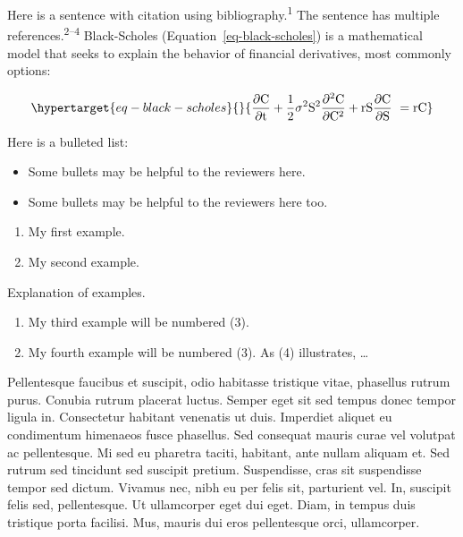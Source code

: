 \documentclass[
  11pt,
  letterpaper,
  DIV=11,
  numbers=noendperiod]{scrartcl}
\providecommand{\tightlist}{%
  \setlength{\itemsep}{0pt}\setlength{\parskip}{0pt}}\usepackage{longtable,booktabs,array}
\begin{document}
Here is a sentence with citation using bibliography.\textsuperscript{1}
The sentence has multiple references.\textsuperscript{2--4}
Black-Scholes (Equation~\ref{eq-black-scholes}) is a mathematical model
that seeks to explain the behavior of financial derivatives, most
commonly options:

\begin{equation}\protect\hypertarget{eq-black-scholes}{}{
\frac{\partial \mathrm C}{ \partial \mathrm t } + \frac{1}{2}\sigma^{2} \mathrm S^{2}
\frac{\partial^{2} \mathrm C}{\partial \mathrm C^2}
  + \mathrm r \mathrm S \frac{\partial \mathrm C}{\partial \mathrm S}\ =
  \mathrm r \mathrm C 
}\label{eq-black-scholes}\end{equation}

Here is a bulleted list:

\begin{itemize}
\tightlist
\item
  Some bullets may be helpful to the reviewers here.
\item
  Some bullets may be helpful to the reviewers here too.
\end{itemize}

\begin{enumerate}
\def\labelenumi{(\arabic{enumi})}
\tightlist
\item
  My first example.
\item
  My second example.
\end{enumerate}

Explanation of examples.

\begin{enumerate}
\def\labelenumi{(\arabic{enumi})}
\setcounter{enumi}{2}
\tightlist
\item
  My third example will be numbered (3).
\item
  My fourth example will be numbered (3). As (4) illustrates, \ldots{}
\end{enumerate}

Pellentesque faucibus et suscipit, odio habitasse tristique vitae,
phasellus rutrum purus. Conubia rutrum placerat luctus. Semper eget sit
sed tempus donec tempor ligula in. Consectetur habitant venenatis ut
duis. Imperdiet aliquet eu condimentum himenaeos fusce phasellus. Sed
consequat mauris curae vel volutpat ac pellentesque. Mi sed eu pharetra
taciti, habitant, ante nullam aliquam et. Sed rutrum sed tincidunt sed
suscipit pretium. Suspendisse, cras sit suspendisse tempor sed dictum.
Vivamus nec, nibh eu per felis sit, parturient vel. In, suscipit felis
sed, pellentesque. Ut ullamcorper eget dui eget. Diam, in tempus duis
tristique porta facilisi. Mus, mauris dui eros pellentesque orci,
ullamcorper.
\end{document}
